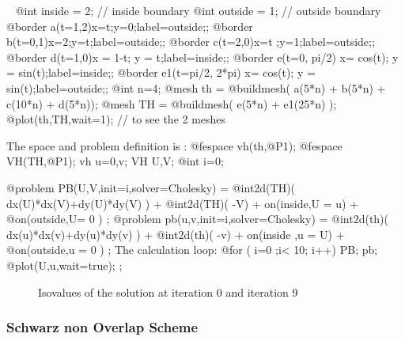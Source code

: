 \documentclass[a4paper,twoside,12pt]{book}
\begin{document}
\begin{example}~
 \bFF
@int inside = 2;  //  inside boundary
@int outside = 1; //  outside boundary
@border a(t=1,2){x=t;y=0;label=outside;};
@border b(t=0,1){x=2;y=t;label=outside;};
@border c(t=2,0){x=t ;y=1;label=outside;};
@border d(t=1,0){x = 1-t; y = t;label=inside;};
@border e(t=0, pi/2){ x= cos(t); y = sin(t);label=inside;};
@border e1(t=pi/2, 2*pi){ x= cos(t); y = sin(t);label=outside;};
@int n=4;
@mesh th = @buildmesh( a(5*n) + b(5*n) + c(10*n) + d(5*n));
@mesh TH = @buildmesh( e(5*n) + e1(25*n) );
@plot(th,TH,wait=1);  //  to see the 2 meshes
\eFF

The space  and problem definition is :
\bFF
@fespace vh(th,@P1);
@fespace VH(TH,@P1);
vh u=0,v; VH U,V;
@int i=0;

@problem PB(U,V,init=i,solver=Cholesky) =
    @int2d(TH)( dx(U)*dx(V)+dy(U)*dy(V) )
  + @int2d(TH)( -V) + on(inside,U = u)  + @on(outside,U= 0 ) ;
@problem pb(u,v,init=i,solver=Cholesky) =
    @int2d(th)( dx(u)*dx(v)+dy(u)*dy(v) )
  + @int2d(th)( -v) + on(inside ,u = U) + @on(outside,u = 0 ) ;
\eFF
 The  calculation loop:
\bFF
@for ( i=0 ;i< 10; i++)
{
   PB;
   pb;
   @plot(U,u,wait=true);
};
\eFF
\end{example}

\begin{figure}[hbt]
\caption{  Isovalues of the solution at  iteration 0  and iteration 9}
\end{figure}



\subsubsection{Schwarz non Overlap Scheme}
\end{document}
